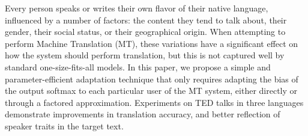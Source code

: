 Every person speaks or writes their own flavor of their native language, influenced by a number of factors: the content they tend to talk about, their gender, their social status, or their geographical origin. When attempting to perform Machine Translation (MT), these variations have a significant effect on how the system should perform translation, but this is not captured well by standard one-size-fits-all models. In this paper, we propose a simple and parameter-efficient adaptation technique that only requires adapting the bias of the output softmax to each particular user of the MT system, either directly or through a factored approximation. Experiments on TED talks in three languages demonstrate improvements in translation accuracy, and better reflection of speaker traits in the target text.
